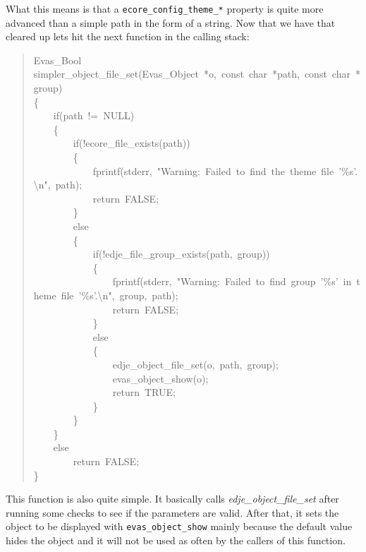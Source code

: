 \documentclass[12pt,a4paper,english]{book}
\newcommand{\titlereference}[1]{\textsl{#1}}
\begin{document}
What this means is that a \texttt{ecore{\_}config{\_}theme{\_}*} property is quite more
advanced than a simple path in the form of a string. Now that we have that
cleared up lets hit the next function in the calling stack:
\begin{quote}{\ttfamily \raggedright \noindent
Evas{\_}Bool~\\
simpler{\_}object{\_}file{\_}set(Evas{\_}Object~*o,~const~char~*path,~const~char~*group)~\\
{\{}~\\
~~~~if(path~!=~NULL)~\\
~~~~{\{}~\\
~~~~~~~~if(!ecore{\_}file{\_}exists(path))~\\
~~~~~~~~{\{}~\\
~~~~~~~~~~~~fprintf(stderr,~"Warning:~Failed~to~find~the~theme~file~'{\%}s'.{\textbackslash}n",~path);~\\
~~~~~~~~~~~~return~FALSE;~\\
~~~~~~~~{\}}~\\
~~~~~~~~else~\\
~~~~~~~~{\{}~\\
~~~~~~~~~~~~if(!edje{\_}file{\_}group{\_}exists(path,~group))~\\
~~~~~~~~~~~~{\{}~\\
~~~~~~~~~~~~~~~~fprintf(stderr,~"Warning:~Failed~to~find~group~'{\%}s'~in~theme~file~'{\%}s'.{\textbackslash}n",~group,~path);~\\
~~~~~~~~~~~~~~~~return~FALSE;~\\
~~~~~~~~~~~~{\}}~\\
~~~~~~~~~~~~else~\\
~~~~~~~~~~~~{\{}~\\
~~~~~~~~~~~~~~~~edje{\_}object{\_}file{\_}set(o,~path,~group);~\\
~~~~~~~~~~~~~~~~evas{\_}object{\_}show(o);~\\
~~~~~~~~~~~~~~~~return~TRUE;~\\
~~~~~~~~~~~~{\}}~\\
~~~~~~~~{\}}~\\
~~~~{\}}~\\
~~~~else~\\
~~~~~~~~return~FALSE;~\\
{\}}
}\end{quote}

This function is also quite simple. It basically calls \titlereference{edje{\_}object{\_}file{\_}set}
after running some checks to see if the parameters are valid. After that, it
sets the object to be displayed with \texttt{evas{\_}object{\_}show} mainly because the
default value hides the object and it will not be used as often by the callers
of this function.
\end{document}

